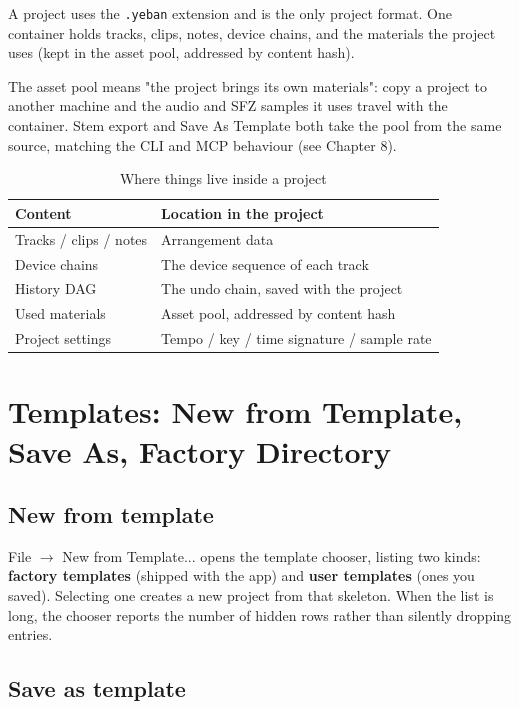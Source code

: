 A project uses the \texttt{.yeban} extension and is the only project format. One
container holds tracks, clips, notes, device chains, and the materials the project
uses (kept in the asset pool, addressed by content hash).

The asset pool means "the project brings its own materials": copy a project to
another machine and the audio and SFZ samples it uses travel with the container.
Stem export and Save As Template both take the pool from the same source, matching
the CLI and MCP behaviour (see Chapter 8).

\begin{table}[htbp]
\centering
\caption{Where things live inside a project}
\label{tab:ch02-container}
\begin{tabular}{ll}
\hline
Content & Location in the project \\
\hline
Tracks / clips / notes & Arrangement data \\
Device chains & The device sequence of each track \\
History DAG & The undo chain, saved with the project \\
Used materials & Asset pool, addressed by content hash \\
Project settings & Tempo / key / time signature / sample rate \\
\hline
\end{tabular}
\end{table}

\section{Templates: New from Template, Save As, Factory Directory}

\subsection{New from template}

File $\to$ New from Template... opens the template chooser, listing two kinds:
\textbf{factory templates} (shipped with the app) and \textbf{user templates} (ones
you saved). Selecting one creates a new project from that skeleton. When the list is
long, the chooser reports the number of hidden rows rather than silently dropping
entries.

\subsection{Save as template}

